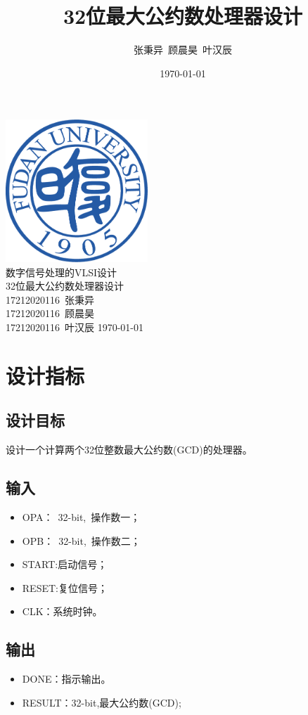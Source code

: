 \documentclass[12pt]{article}
\title{32位最大公约数处理器设计}
\author{张秉异~顾晨昊~叶汉辰}
\date{\today}
\begin{document}
\begin{titlepage} 
\begin{center}
\includegraphics[width=0.4\textwidth]{./fdulogo}\\[2cm] 
\textsc{\huge 数字信号处理的VLSI设计}\\[0.8cm]
\textsc{\huge 32位最大公约数处理器设计}\\[3cm] 
\large 17212020116~张秉异 \\17212020116~顾晨昊 \\17212020116~叶汉辰
\vfill {\large \today} 
\end{center} 
\end{titlepage}

\tableofcontents
\newpage

\section{设计指标}
\subsection{设计目标}
设计一个计算两个32位整数最大公约数(GCD)的处理器。

\subsection{输入}
\begin{itemize}
\item OPA：~32-bit,~操作数一；
\item OPB：~32-bit,~操作数二；
\item START:启动信号；
\item RESET:复位信号；
\item CLK：系统时钟。
\end{itemize}

\subsection{输出}
\begin{itemize}
\item DONE：指示输出。
\item RESULT：32-bit,最大公约数(GCD);
\end{itemize}
\end{document}
